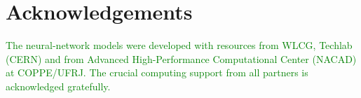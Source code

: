 \section*{Acknowledgements}\label{sec:thanks}

\textcolor{green}{
The neural-network models were developed with resources from WLCG,
Techlab (CERN) and from Advanced High-Performance Computational Center
(NACAD) at COPPE/UFRJ. The crucial computing support from all partners
is acknowledged gratefully.
}